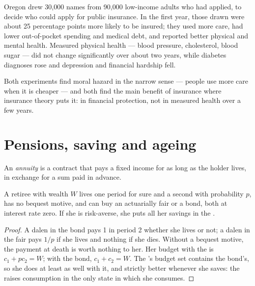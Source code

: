 \begin{record}
Oregon drew 30{,}000 names from 90{,}000 low-income adults who had applied, to decide
who could apply for public insurance. In the first year, those drawn were about 25
percentage points more likely to be insured; they used more care, had lower
out-of-pocket spending and medical debt, and reported better physical and mental
health. %
Measured physical health --- blood pressure, cholesterol, blood sugar --- did not
change significantly over about two years, while diabetes diagnoses rose and
depression and financial hardship fell. %
\end{record}

Both experiments find moral hazard in the narrow sense --- people use more care
when it is cheaper --- and both find the main benefit of insurance where insurance
theory puts it: in financial protection, not in measured health over a few years.

\section{Pensions, saving and ageing}\label{sec:b3:social-insurance:pensions}

\begin{definition}[Annuity]\label{def:b3:social-insurance:annuity}
An \emph{annuity} is a contract that pays a fixed income for as long as the holder
lives, in exchange for a sum paid in advance.
\end{definition}

\begin{proposition}\label{prop:b3:social-insurance:yaari}
A retiree with wealth $W$ lives one period for sure and a second with probability $p$,
has no bequest motive, and can buy an actuarially fair  or a bond, both at
interest rate zero. If she is risk-averse, she puts all her savings in the .
\end{proposition}

\begin{proof}
A dalen in the bond pays 1 in period 2 whether she lives or not; a dalen in the fair
 pays $1/p$ if she lives and nothing if she dies. Without a bequest motive,
the payment at death is worth nothing to her. Her budget with the  is
$c_1 + pc_2 = W$; with the bond, $c_1 + c_2 = W$. The 's budget set contains the bond's,
so she does at least as well with it, and strictly better whenever she saves: the
 raises consumption in the only state in which she consumes.
\end{proof}

